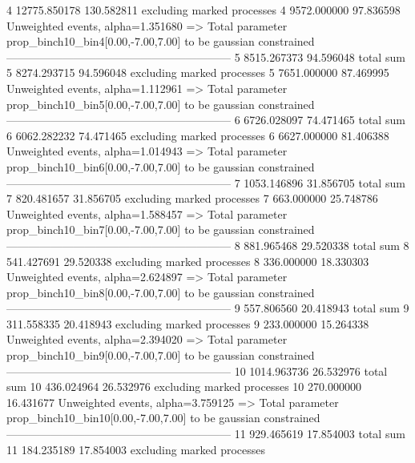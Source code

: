 4          12775.850178    130.582811      excluding marked processes    
4          9572.000000     97.836598       Unweighted events, alpha=1.351680
  => Total parameter prop_binch10_bin4[0.00,-7.00,7.00] to be gaussian constrained
------------------------------------------------------------
5          8515.267373     94.596048       total sum                     
5          8274.293715     94.596048       excluding marked processes    
5          7651.000000     87.469995       Unweighted events, alpha=1.112961
  => Total parameter prop_binch10_bin5[0.00,-7.00,7.00] to be gaussian constrained
------------------------------------------------------------
6          6726.028097     74.471465       total sum                     
6          6062.282232     74.471465       excluding marked processes    
6          6627.000000     81.406388       Unweighted events, alpha=1.014943
  => Total parameter prop_binch10_bin6[0.00,-7.00,7.00] to be gaussian constrained
------------------------------------------------------------
7          1053.146896     31.856705       total sum                     
7          820.481657      31.856705       excluding marked processes    
7          663.000000      25.748786       Unweighted events, alpha=1.588457
  => Total parameter prop_binch10_bin7[0.00,-7.00,7.00] to be gaussian constrained
------------------------------------------------------------
8          881.965468      29.520338       total sum                     
8          541.427691      29.520338       excluding marked processes    
8          336.000000      18.330303       Unweighted events, alpha=2.624897
  => Total parameter prop_binch10_bin8[0.00,-7.00,7.00] to be gaussian constrained
------------------------------------------------------------
9          557.806560      20.418943       total sum                     
9          311.558335      20.418943       excluding marked processes    
9          233.000000      15.264338       Unweighted events, alpha=2.394020
  => Total parameter prop_binch10_bin9[0.00,-7.00,7.00] to be gaussian constrained
------------------------------------------------------------
10         1014.963736     26.532976       total sum                     
10         436.024964      26.532976       excluding marked processes    
10         270.000000      16.431677       Unweighted events, alpha=3.759125
  => Total parameter prop_binch10_bin10[0.00,-7.00,7.00] to be gaussian constrained
------------------------------------------------------------
11         929.465619      17.854003       total sum                     
11         184.235189      17.854003       excluding marked processes    
